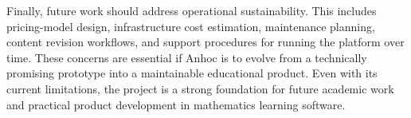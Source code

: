 Finally, future work should address operational sustainability. This includes pricing-model design, infrastructure cost estimation, maintenance planning, content revision workflows, and support procedures for running the platform over time. These concerns are essential if Anhoc is to evolve from a technically promising prototype into a maintainable educational product. Even with its current limitations, the project is a strong foundation for future academic work and practical product development in mathematics learning software.

